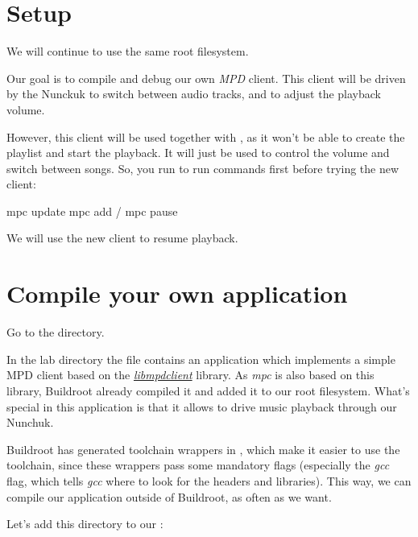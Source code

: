 
\section{Setup}

We will continue to use the same root filesystem.

Our goal is to compile and debug our own {\em MPD} client. This client
will be driven by the Nunckuk to switch between audio tracks, and to
adjust the playback volume.

However, this client will be used together with , as it won't
be able to create the playlist and start the playback. It will just be
used to control the volume and switch between songs. So, you run to
run  commands first before trying the new client:

\begin{bashinput}
mpc update
mpc add /
mpc pause
\end{bashinput}

We will use the new client to resume playback.

\section{Compile your own application}

Go to the  directory.

In the lab directory the file  contains an
application which implements a simple MPD client based on the
{\em \href{https://musicpd.org/libs/libmpdclient/}{libmpdclient}} library.
As {\em mpc} is also based on this library, Buildroot already compiled
it and added it to our root filesystem. What's special in this
application is that it allows to drive music playback through our
Nunchuk.

Buildroot has generated toolchain wrappers in
, which make it easier to use the toolchain,
since these wrappers pass some mandatory flags (especially the
 {\em gcc} flag, which tells {\em gcc} where to look
for the headers and libraries). This way, we can compile our application
outside of Buildroot, as often as we want.

Let's add this directory to our :

\small
{}
\normalsize

